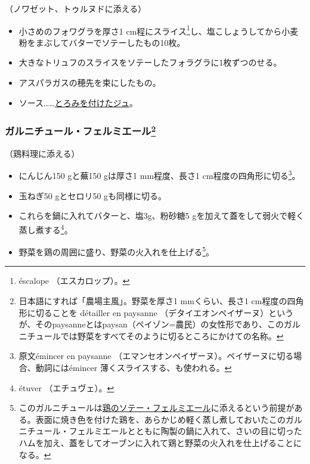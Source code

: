 \begin{recette}


（ノワゼット、トゥルヌドに添える）

\begin{itemize}
\item
  小さめのフォワグラを厚さ1 cm程にスライス\footnote{éscalope
    （エスカロップ）。}し、塩こしょうしてから小麦粉をまぶしてバターでソテーしたもの10枚。
\item
  大きなトリュフのスライスをソテーしたフォラグラに1枚ずつのせる。
\item
  アスパラガスの穂先を束にしたもの。
\item
  ソース\ldots{}\ldots{}\protect\hyperlink{jus-de-veau-lie}{とろみを付けたジュ}。
\end{itemize}

\hypertarget{garniture-a-la-fermiere}{%
\subsubsection[ガルニチュール・フェルミエール]{\texorpdfstring{ガルニチュール・フェルミエール\footnote{日本語にすれば「農場主風」。野菜を厚さ1
  mmくらい、長さ1 cm程度の四角形に切ることを détailler en paysanne
  （デタイエオンペイザーヌ）というが、そのpaysanneとはpaysan（ペイゾン=農民）の女性形であり、このガルニチュールでは野菜をすべてそのように切るところにかけての名称。}}{ガルニチュール・フェルミエール}}\label{garniture-a-la-fermiere}}



（鶏料理に添える）

\begin{itemize}
\item
  にんじん150 gと蕪150 gは厚さ1 mm程度、長さ1
  cm程度の四角形に切る\footnote{原文émincer en paysanne
    （エマンセオンペイザーヌ）。ペイザーヌに切る場合、動詞にはémincer
    薄くスライスする、も使われる。}。
\item
  玉ねぎ50 gとセロリ50 gも同様に切る。
\item
  これらを鍋に入れてバターと、塩3g、粉砂糖5
  gを加えて蓋をして弱火で軽く蒸し煮する\footnote{étuver （エチュヴェ）。}。
\item
  野菜を鶏の周囲に盛り、野菜の火入れを仕上げる\footnote{このガルニチュールは\protect\hyperlink{poulet-saute-a-la-fermiere}{鶏のソテー・フェルミエール}に添えるという前提がある。表面に焼き色を付けた鶏を、あらかじめ軽く蒸し煮しておいたこのガルニチュール・フェルミエールとともに陶製の鍋に入れて、さいの目に切ったハムを加え、蓋をしてオーブンに入れて鶏と野菜の火入れを仕上げることになる。}。
\end{itemize}


\end{recette}
